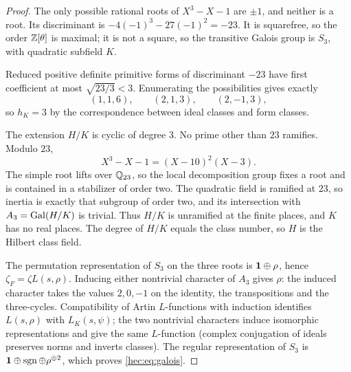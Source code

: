 \begin{proof}
The only possible rational roots of $X^3-X-1$ are $\pm1$, and neither is a root. Its discriminant is
$-4(-1)^3-27(-1)^2=-23$. It is squarefree, so the order $\mathbb{Z}[\theta]$ is maximal; it is not a square, so the
transitive Galois group is $S_3$, with quadratic subfield $K$.

Reduced positive definite primitive forms of discriminant $-23$ have first coefficient at most
$\sqrt{23/3}<3$. Enumerating the possibilities gives exactly
\[
(1,1,6),\qquad (2,1,3),\qquad (2,-1,3),
\]
so $h_K=3$ by the correspondence between ideal classes and form classes.

The extension $H/K$ is cyclic of degree $3$. No prime other than $23$ ramifies. Modulo $23$,
\[
X^3-X-1=(X-10)^2(X-3).
\]
The simple root lifts over $\mathbb{Q}_{23}$, so the local decomposition group fixes a root and is contained in a
stabilizer of order two. The quadratic field is ramified at $23$, so inertia is exactly that subgroup of
order two, and its intersection with $A_3=\operatorname{Gal}(H/K)$ is trivial. Thus $H/K$ is unramified at the finite
places, and $K$ has no real places. The degree of $H/K$ equals the class number, so $H$ is the Hilbert
class field.

The permutation representation of $S_3$ on the three roots is $\mathbf{1}\oplus\rho$, hence
$\zeta_F=\zeta L(s,\rho)$. Inducing either nontrivial character of $A_3$ gives $\rho$: the induced
character takes the values $2,0,-1$ on the identity, the transpositions and the three-cycles.
Compatibility of Artin $L$-functions with induction identifies $L(s,\rho)$ with $L_K(s,\psi)$; the two
nontrivial characters induce isomorphic representations and give the same $L$-function (complex conjugation
of ideals preserves norms and inverts classes). The regular representation of $S_3$ is
$\mathbf{1}\oplus\operatorname{sgn}\oplus\rho^{\oplus2}$, which proves \eqref{hec:eq:galois}.
\end{proof}

